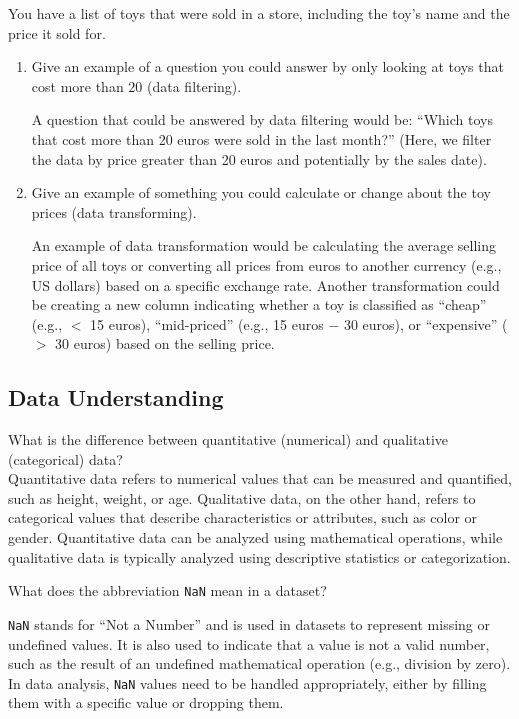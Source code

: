 \begin{ejercicio}
    You have a list of toys that were sold in a store, including the toy's name and the price it sold for.
    \begin{enumerate}
        \item Give an example of a question you could answer by only looking at toys that cost more than $20$ (data filtering).
        
        A question that could be answered by data filtering would be: ``Which toys that cost more than 20 euros were sold in the last month?'' (Here, we filter the data by price greater than 20 euros and potentially by the sales date).
        \item Give an example of something you could calculate or change about the toy prices (data transforming).
        
        An example of data transformation would be calculating the average selling price of all toys or converting all prices from euros to another currency (e.g., US dollars) based on a specific exchange rate. Another transformation could be creating a new column indicating whether a toy is classified as ``cheap'' (e.g., $<$ 15 euros), ``mid-priced'' (e.g., 15 euros $-$ 30 euros), or ``expensive'' ($>$ 30 euros) based on the selling price.
    \end{enumerate}
\end{ejercicio}

\subsection*{Data Understanding}

\begin{ejercicio}
    What is the difference between quantitative (numerical) and qualitative (categorical) data?\\

    Quantitative data refers to numerical values that can be measured and quantified, such as height, weight, or age. Qualitative data, on the other hand, refers to categorical values that describe characteristics or attributes, such as color or gender. Quantitative data can be analyzed using mathematical operations, while qualitative data is typically analyzed using descriptive statistics or categorization.
\end{ejercicio}

\begin{ejercicio}
    What does the abbreviation \verb|NaN| mean in a dataset?

    \verb|NaN| stands for ``Not a Number'' and is used in datasets to represent missing or undefined values. It is also used to indicate that a value is not a valid number, such as the result of an undefined mathematical operation (e.g., division by zero). In data analysis, \verb|NaN| values need to be handled appropriately, either by filling them with a specific value or dropping them.
\end{ejercicio}

